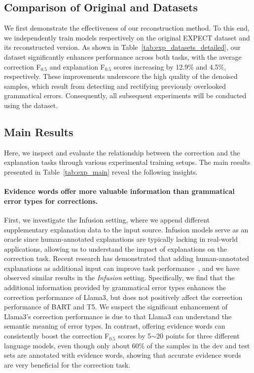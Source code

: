 \subsection{Comparison of Original and \Dataset{} Datasets}
\label{subsec:exp_datasets}
We first demonstrate the effectiveness of our reconstruction method. To this end, we independently train models respectively on the original EXPECT dataset and its reconstructed version. As shown in Table~\ref{tab:exp_datasets_detailed}, our \Dataset{} dataset significantly enhances performance across both tasks, with the average correction F$_{0.5}$ and explanation F$_{0.5}$ scores increasing by 12.9\% and 4.5\%, respectively. These improvements underscore the high quality of the denoised samples, which result from detecting and rectifying previously overlooked grammatical errors. Consequently, all subsequent experiments will be conducted using the \Dataset{} dataset.





\subsection{Main Results}
Here, we inspect and evaluate the relationship between the correction and the explanation tasks through various experimental training setups. The main results presented in Table~\ref{tab:exp_main} reveal the following insights.

\paragraph{Evidence words offer more valuable information than grammatical error types for corrections.}
First, we investigate the Infusion setting, where we append different supplementary explanation data to the input source. Infusion models serve as an oracle since human-annotated explanations are typically lacking in real-world applications, allowing us to understand the impact of explanations on the correction task. Recent research has demonstrated that adding human-annotated explanations as additional input can improve task performance~\citep{hase-etal-2020-leakage,yao-etal-2023-human}, and we have observed similar results in the \textit{Infusion} setting. Specifically, we find that the additional information provided by grammatical error types enhances the correction performance of Llama3, but does not positively affect the correction performance of BART and T5. We suspect the significant enhancement of Llama3's correction performance is due to that Llama3 can understand the semantic meaning of error types. In contrast, offering evidence words can consistently boost the correction F$_{0.5}$ scores by 5$\sim$20 points for three different language models, even though only about 60\% of the samples in the dev and test sets are annotated with evidence words, showing that accurate evidence words are very beneficial for the correction task.

